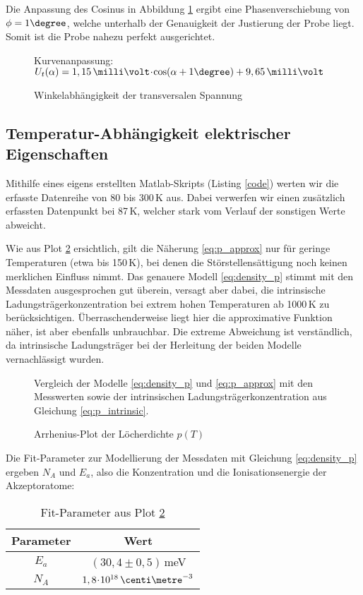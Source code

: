 Die Anpassung des Cosinus in Abbildung \ref{fig:plot_alpha} ergibt eine Phasenverschiebung von $\phi = 1\degree$, welche unterhalb der Genauigkeit der Justierung der Probe liegt. Somit ist die Probe nahezu perfekt ausgerichtet.

\begin{figure}[p]
\centering

\caption{Winkelabhängigkeit der transversalen Spannung}
\label{fig:plot_alpha}
\vspace{-0.5ex}
Kurvenanpassung: $U_t(\alpha) = 1,15 \,\milli\volt \cdt \cos (\alpha + 1\degree) + 9,65\,\milli\volt$
\vspace{-7em}
\end{figure}

\newpage
\subsection{Temperatur-Abhängigkeit elektrischer Eigenschaften} 
Mithilfe eines eigens erstellten Matlab-Skripts (Listing \ref{code}) werten wir die erfasste Datenreihe von 80 bis 300\,K aus. Dabei verwerfen wir einen zusätzlich erfassten Datenpunkt bei 87\,K, welcher stark vom Verlauf der sonstigen Werte abweicht.

Wie aus Plot \ref{fig:plot_p} ersichtlich, gilt die Näherung \eqref{eq:p_approx} nur für geringe Temperaturen (etwa bis 150\,K), bei denen die Störstellensättigung noch keinen merklichen Einfluss nimmt. Das genauere Modell \eqref{eq:density_p} stimmt mit den Messdaten ausgesprochen gut überein, versagt aber dabei, die intrinsische Ladungsträgerkonzentration bei extrem hohen Temperaturen ab 1000\,K zu berücksichtigen.
Überraschenderweise liegt hier die approximative Funktion näher, ist aber ebenfalls unbrauchbar. Die extreme Abweichung ist verständlich, da intrinsische Ladungsträger bei der Herleitung der beiden Modelle vernachlässigt wurden.

\begin{figure}[p]
\centering
\begin{sideways}

\end{sideways}
\caption{Arrhenius-Plot der Löcherdichte $p(T)$}
\label{fig:plot_p}
\vspace{1ex}
Vergleich der Modelle \eqref{eq:density_p} und \eqref{eq:p_approx} mit den Messwerten sowie der intrinsischen Ladungsträgerkonzentration aus Gleichung \eqref{eq:p_intrinsic}.
\end{figure}

Die Fit-Parameter zur Modellierung der Messdaten mit Gleichung \eqref{eq:density_p} ergeben $N_A$ und $E_a$, also die Konzentration und die Ionisationsenergie der Akzeptoratome:
\begin{table}[h!]
\centering
\caption{Fit-Parameter aus Plot \ref{fig:plot_p}} \label{tab:p_fit}
\begin{tabular}{cc}
	\toprule
	Parameter		& Wert 							\\
	\midrule
	$E_a$		& $(30,4 \pm 0,5)\,$meV				\\
	$N_A$		& $1,8 \cdt 10^{18}\,\centi\metre^{-3}$	\\
	\bottomrule
\end{tabular}
\end{table}

